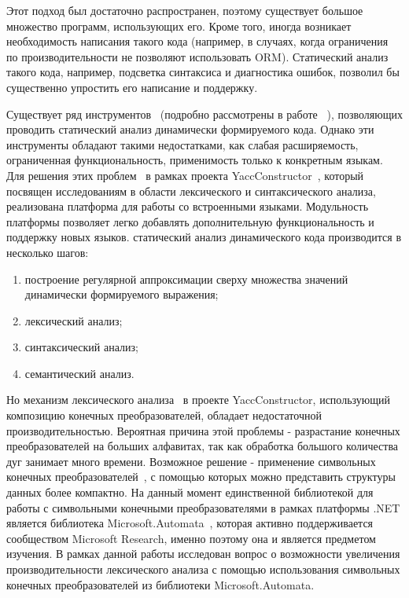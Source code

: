 \documentclass[14pt]{matmex-diploma}
\begin{document}
Этот подход был достаточно распространен, поэтому существует большое множество программ, использующих его. Кроме того, иногда возникает необходимость написания такого кода (например, в случаях, когда ограничения по производительности не позволяют использовать ORM). Статический анализ такого кода, например, подсветка синтаксиса и диагностика ошибок, позволил бы существенно упростить его написание и поддержку.

Существует ряд инструментов~\cite{Alvor, JSA, PHPSA} (подробно рассмотрены в работе ~\cite{polubelova}), позволяющих проводить статический анализ динамически формируемого кода. Однако эти инструменты обладают такими недостатками, как слабая расширяемость, ограниченная функциональность, применимость только к конкретным языкам. Для решения этих проблем~\cite{GrigorievPhd} в рамках проекта YaccConstructor~\cite{YCUrl, articleYC}, который посвящен исследованиям в области лексического и синтаксического анализа, реализована платформа для работы со встроенными языками. Модульность платформы позволяет легко добавлять дополнительную функциональность и поддержку новых языков. статический анализ динамического кода производится в несколько шагов: 
\begin{enumerate}
\item построение регулярной аппроксимации сверху множества значений динамически формируемого выражения;
\item лексический анализ;
\item синтаксический анализ;
\item семантический анализ.
\end{enumerate}

Но механизм лексического анализа~\cite{polubelova} в проекте YaccConstructor, использующий композицию конечных преобразователей, обладает недостаточной производительностью. Вероятная причина этой проблемы - разрастание конечных преобразователей на больших алфавитах, так как обработка большого количества дуг занимает много времени. Возможное решение - применение символьных конечных преобразователей~\cite{st}, с помощью которых можно представить структуры данных более компактно. 
На данный момент единственной библиотекой для работы с символьными конечными преобразователями в рамках платформы .NET является библиотека Microsoft.Automata~\cite{MSAUrl}, которая активно поддерживается сообществом Microsoft Research, именно поэтому она и является предметом изучения.
В рамках данной работы исследован вопрос о возможности увеличения производительности лексического анализа с помощью использования символьных конечных преобразователей из библиотеки Microsoft.Automata.
\end{document}

